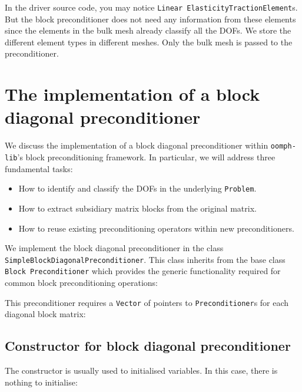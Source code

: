 In the driver source code, you may notice \texttt{Linear\allowbreak
  Elasticity\allowbreak Traction\allowbreak Element}s. But the block
preconditioner does not need any information from these elements since the
elements in the bulk mesh already classify all the DOFs. We store the different
element types in different meshes. Only the bulk mesh is passed to the
preconditioner.

\section{The implementation of a block diagonal preconditioner\label{sec:the_implementation_of_a_block_diagonal_preconditioner}}

We discuss the implementation of a block diagonal preconditioner within
\texttt{oomph-\allowbreak lib}'s block preconditioning framework. In particular, we will
address three fundamental tasks: 
\begin{itemize} 
  \item How to identify and classify the DOFs in the underlying \texttt{Problem}.  
  \item How to extract subsidiary matrix blocks from the original matrix.
  \item How to reuse existing preconditioning operators within new preconditioners.
\end{itemize}

We implement the block diagonal preconditioner in the class
\texttt{Simple\allowbreak Block\allowbreak Diagonal\allowbreak Preconditioner}.
This class inherits from the base class \texttt{Block\allowbreak
  Preconditioner} which provides the generic functionality required for common
block preconditioning operations:
\lstset{numberstyle=\ttfamily\scriptsize,
        breaklines=true, 
        numbers=left, 
        stepnumber=2, 
        frame=single,
        basicstyle=\ttfamily\scriptsize, 
        showstringspaces=false, 
        language=C++}

This preconditioner requires a \texttt{Vector} of pointers to \texttt{Preconditioner}s for each diagonal block matrix:


\subsection{Constructor for block diagonal preconditioner\label{sec:constructor_for_block_diagonal_preconditioner}}
The constructor is usually used to initialised variables. In this case, there is nothing to initialise:

